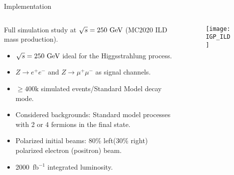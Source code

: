 \newcommand{\eV}{\text{e\kern-0.15ex V}}
\newcommand{\GeV}{\text{G\eV}}

\begin{block}{Implementation}
\begin{columns}
\begin{column}{.7\textwidth}
    Full simulation study at $\sqrt{s} = 250~\GeV$ (MC2020 ILD mass production).
    \begin{itemize}
        \item $\sqrt{s} = 250~\GeV$ ideal for the Higgsstrahlung process.
        \item $Z \to e^+ e^-$ and $Z \to \mu^+ \mu^-$ as signal channels.
        \item $\geq 400$k simulated events/Standard Model decay mode.
        \item Considered backgrounds: Standard model processes \\
            with 2 or 4 fermions in the final state.
        \item Polarized initial beams: 80\% left(30\% right) polarized electron (positron) beam.
        \item 2000~fb$^{-1}$ integrated luminosity.
    \end{itemize}
\end{column}
\begin{column}{.3\textwidth}
    \begin{figure}
        \centering\texttt{[image: IGP\_ILD]}
    \end{figure}
\end{column}
\end{columns}
\end{block}
